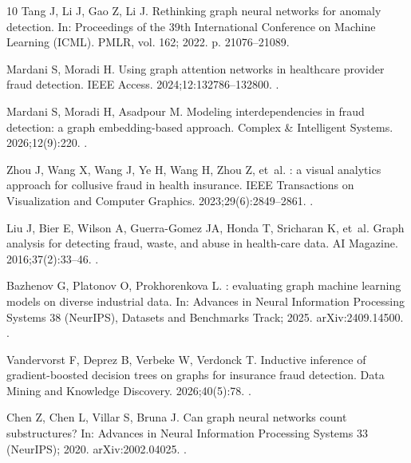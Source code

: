 \documentclass[pdflatex,sn-vancouver-num]{sn-jnl}
\begin{document}
\begin{thebibliography}{10}
Tang J, Li J, Gao Z, Li J.
\newblock Rethinking graph neural networks for anomaly detection.
\newblock In: Proceedings of the 39th International Conference on Machine
  Learning (ICML). PMLR, vol. 162; 2022. p. 21076--21089.

Mardani S, Moradi H.
\newblock Using graph attention networks in healthcare provider fraud
  detection.
\newblock IEEE Access. 2024;12:132786--132800.
\newblock {}.

Mardani S, Moradi H, Asadpour M.
\newblock Modeling interdependencies in fraud detection: a graph
  embedding-based approach.
\newblock Complex \& Intelligent Systems. 2026;12(9):220.
\newblock {}.

Zhou J, Wang X, Wang J, Ye H, Wang H, Zhou Z, et~al.
: a visual analytics approach for collusive fraud in
  health insurance.
\newblock IEEE Transactions on Visualization and Computer Graphics.
  2023;29(6):2849--2861.
\newblock {}.

Liu J, Bier E, Wilson A, Guerra-Gomez JA, Honda T, Sricharan K, et~al.
\newblock Graph analysis for detecting fraud, waste, and abuse in health-care
  data.
\newblock AI Magazine. 2016;37(2):33--46.
\newblock {}.

Bazhenov G, Platonov O, Prokhorenkova L.
: evaluating graph machine learning models on diverse
  industrial data.
\newblock In: Advances in Neural Information Processing Systems 38 (NeurIPS),
  Datasets and Benchmarks Track; 2025. {arXiv}:2409.14500.
\newblock {}.

Vandervorst F, Deprez B, Verbeke W, Verdonck T.
\newblock Inductive inference of gradient-boosted decision trees on graphs for
  insurance fraud detection.
\newblock Data Mining and Knowledge Discovery. 2026;40(5):78.
\newblock {}.

Chen Z, Chen L, Villar S, Bruna J.
\newblock Can graph neural networks count substructures?
\newblock In: Advances in Neural Information Processing Systems 33 (NeurIPS);
  2020. {arXiv}:2002.04025.
\newblock {}.


\end{thebibliography}
\end{document}
